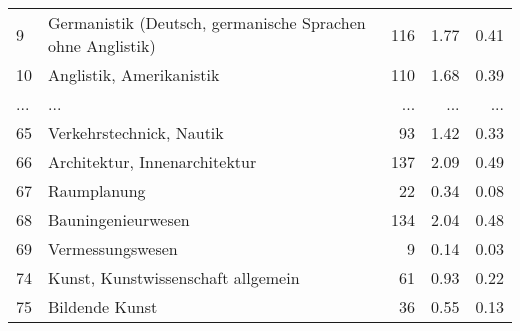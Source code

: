 \begin{longtable}{lXrrr}
        9 & \multicolumn{1}{X}{Germanistik (Deutsch, germanische Sprachen ohne Anglistik)} & %
          \num{116} &
          \num[round-mode=places,round-precision=2]{1.77} &
          \num[round-mode=places,round-precision=2]{0.41} \\
        10 & \multicolumn{1}{X}{Anglistik, Amerikanistik} & %
          \num{110} &
          \num[round-mode=places,round-precision=2]{1.68} &
          \num[round-mode=places,round-precision=2]{0.39} \\
       ... & ... & ... & ... & ... \\
        65 & \multicolumn{1}{X}{Verkehrstechnick, Nautik} & %
          \num{93} &
          \num[round-mode=places,round-precision=2]{1.42} &
          \num[round-mode=places,round-precision=2]{0.33} \\

        66 & \multicolumn{1}{X}{Architektur, Innenarchitektur} & %
          \num{137} &
          \num[round-mode=places,round-precision=2]{2.09} &
          \num[round-mode=places,round-precision=2]{0.49} \\

        67 & \multicolumn{1}{X}{Raumplanung} & %
          \num{22} &
          \num[round-mode=places,round-precision=2]{0.34} &
          \num[round-mode=places,round-precision=2]{0.08} \\

        68 & \multicolumn{1}{X}{Bauningenieurwesen} & %
          \num{134} &
          \num[round-mode=places,round-precision=2]{2.04} &
          \num[round-mode=places,round-precision=2]{0.48} \\

        69 & \multicolumn{1}{X}{Vermessungswesen} & %
          \num{9} &
          \num[round-mode=places,round-precision=2]{0.14} &
          \num[round-mode=places,round-precision=2]{0.03} \\

        74 & \multicolumn{1}{X}{Kunst, Kunstwissenschaft allgemein} & %
          \num{61} &
          \num[round-mode=places,round-precision=2]{0.93} &
          \num[round-mode=places,round-precision=2]{0.22} \\

        75 & \multicolumn{1}{X}{Bildende Kunst} & %
          \num{36} &
          \num[round-mode=places,round-precision=2]{0.55} &
          \num[round-mode=places,round-precision=2]{0.13} \\


\end{longtable}
